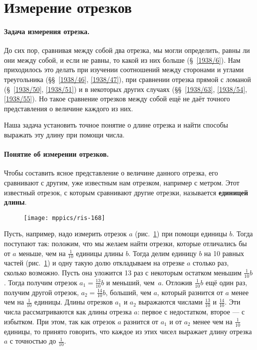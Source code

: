 \section{Измерение отрезков}

\paragraph{Задача измерения отрезка.}\label{1938/144}
До сих пор, сравнивая между собой два отрезка, мы могли определить, равны ли они между собой, и если не равны, то какой из них больше (§~\ref{1938/6}).
Нам приходилось это делать при изучении соотношений между сторонами и углами треугольника (§§~\ref{1938/46}, \ref{1938/47}), при сравнении отрезка прямой с ломаной (§~\ref{1938/50}, \ref{1938/51}) и в некоторых других случаях (§§~\ref{1938/63}, \ref{1938/54}, \ref{1938/55}).
Но такое сравнение отрезков между собой ещё не даёт точного представления о величине каждого из них.

Наша задача установить точное понятие о длине отрезка и найти способы выражать эту длину при помощи числа.

\paragraph{Понятие об измерении отрезков.}\label{1938/150} 
Чтобы составить ясное представление о величине данного отрезка, его сравнивают с другим, уже известным нам отрезком, например с метром.
Этот известный отрезок, с которым сравнивают другие отрезки, называется \textbf{единицей длины}.

\begin{figure}[!ht]
\centering
\texttt{[image: mppics/ris-168]}
\caption{}\label{1938/ris-168}
\end{figure}

Пусть, например, надо измерить отрезок $a$ (рис.~\ref{1938/ris-168}) при помощи единицы $b$.
Тогда поступают так:
положим, что мы желаем найти отрезки, которые отличались бы от $a$ меньше, чем на
$\tfrac1{10}$ единицы длины $b$.
Тогда делим единицу $b$ на 10 равных частей (рис.~\ref{1938/ris-168}) и одну такую долю откладываем на отрезке $a$ столько раз, сколько возможно.
Пусть она уложится 13 раз с некоторым остатком меньшим $\tfrac1{10}b$.
Тогда получим отрезок $a_1=\tfrac{13}{10}b$ и меньший, чем~$a$.
Отложив $\tfrac1{10}b$ ещё один раз, получим другой отрезок, $a_2=\tfrac{14}{10}b$,  больший, чем $a$, который разнится от $a$ менее чем на $\tfrac1{10}$ единицы.
Длины отрезков $a_1$ и $a_2$ выражаются числами $\tfrac{13}{10}$ и $\tfrac{14}{10}$.
Эти числа рассматриваются как  длины отрезка $a$:
первое с недостатком, второе — с избытком.
При этом, так как отрезок $a$ разнится от $a_1$ и от $a_2$ менее чем на $\tfrac1{10}$ единицы, то принято говорить, что каждое из этих чисел выражает длину отрезка $a$ с точностью до $\tfrac1{10}$.

